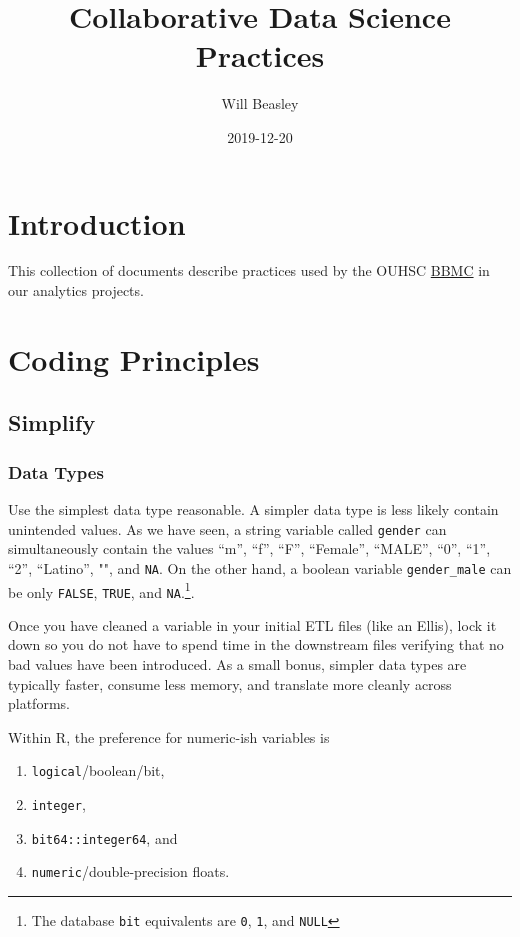 \documentclass[
]{book}
\title{Collaborative Data Science Practices}
\author{Will Beasley}
\date{2019-12-20}
\providecommand{\tightlist}{%
  \setlength{\itemsep}{0pt}\setlength{\parskip}{0pt}}
\begin{document}
\frontmatter
\maketitle

{
\setcounter{tocdepth}{1}
\tableofcontents
}
\mainmatter
\hypertarget{intro}{%
\chapter{Introduction}\label{intro}}

This collection of documents describe practices used by the OUHSC \href{https://ouhsc.edu/bbmc}{BBMC} in our analytics projects.

\hypertarget{coding}{%
\chapter{Coding Principles}\label{coding}}

\hypertarget{simplify}{%
\section{Simplify}\label{simplify}}

\hypertarget{data-types}{%
\subsection{Data Types}\label{data-types}}

Use the simplest data type reasonable. A simpler data type is less likely contain unintended values. As we have seen, a string variable called \texttt{gender} can simultaneously contain the values ``m'', ``f'', ``F'', ``Female'', ``MALE'', ``0'', ``1'', ``2'', ``Latino'', "", and \texttt{NA}. On the other hand, a boolean variable \texttt{gender\_male} can be only \texttt{FALSE}, \texttt{TRUE}, and \texttt{NA}.\footnote{The database \texttt{bit} equivalents are \texttt{0}, \texttt{1}, and \texttt{NULL}}.

Once you have cleaned a variable in your initial ETL files (like an Ellis), lock it down so you do not have to spend time in the downstream files verifying that no bad values have been introduced. As a small bonus, simpler data types are typically faster, consume less memory, and translate more cleanly across platforms.

Within R, the preference for numeric-ish variables is

\begin{enumerate}
\def\labelenumi{\arabic{enumi}.}
\tightlist
\item
  \texttt{logical}/boolean/bit,
\item
  \texttt{integer},
\item
  \texttt{bit64::integer64}, and
\item
  \texttt{numeric}/double-precision floats.
\end{enumerate}
\end{document}
